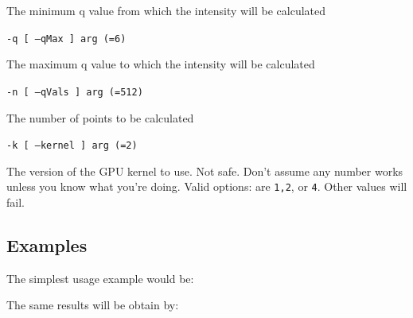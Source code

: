 \documentclass[../D+Manual.tex]{subfiles}
\begin{document}
The minimum q value from which the intensity will be calculated

\texttt{-q [ --qMax ] arg (=6)}

The maximum q value to which the intensity will be calculated

\texttt{-n [ --qVals ] arg (=512)}

The number of points to be calculated

\texttt{-k [ --kernel ] arg (=2)}

The version of the GPU kernel to use. Not
safe. Don't assume any number works unless
you know what you're doing. Valid options:
are \texttt{1,2}, or \texttt{4}. Other values will fail.

\subsection{Examples}

The simplest usage example would be:


\noindent The same results will be obtain by: 



\printbibliography[heading=subbibliography]
\end{document}
